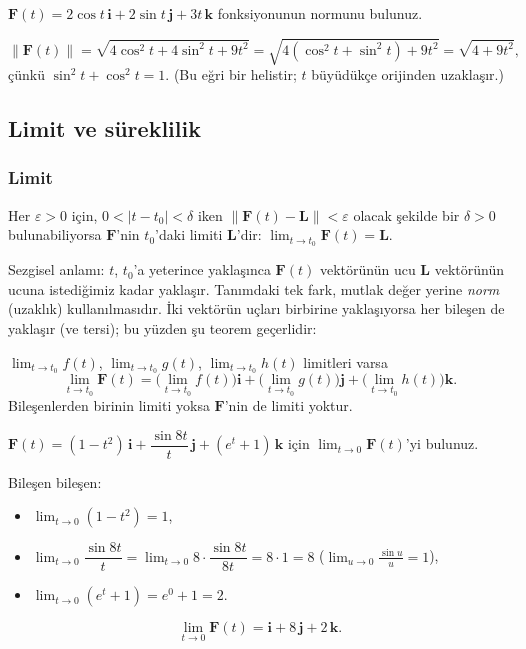 \begin{soru}
$\mathbf F(t)=2\cos t\,\mathbf i+2\sin t\,\mathbf j+3t\,\mathbf k$ fonksiyonunun normunu bulunuz.
\end{soru}
\begin{cevap}
\[ \|\mathbf F(t)\|=\sqrt{4\cos^2t+4\sin^2t+9t^2}=\sqrt{4(\cos^2t+\sin^2t)+9t^2}=\sqrt{4+9t^2}, \]
çünkü $\sin^2t+\cos^2t=1$. (Bu eğri bir helistir; $t$ büyüdükçe orijinden uzaklaşır.)
\end{cevap}

\subsection{Limit ve süreklilik}

\subsubsection{Limit}

\begin{tanim}[Limit]
Her $\varepsilon>0$ için, $0<|t-t_0|<\delta$ iken $\|\mathbf F(t)-\mathbf L\|<\varepsilon$ olacak şekilde bir $\delta>0$
bulunabiliyorsa $\mathbf F$'nin $t_0$'daki limiti $\mathbf L$'dir: $\displaystyle\lim_{t\to t_0}\mathbf F(t)=\mathbf L$.
\end{tanim}

Sezgisel anlamı: $t$, $t_0$'a yeterince yaklaşınca $\mathbf F(t)$ vektörünün ucu $\mathbf L$ vektörünün ucuna istediğimiz
kadar yaklaşır. Tanımdaki tek fark, mutlak değer yerine \emph{norm} (uzaklık) kullanılmasıdır. İki vektörün uçları
birbirine yaklaşıyorsa her bileşen de yaklaşır (ve tersi); bu yüzden şu teorem geçerlidir:

\begin{teorem}
$\lim_{t\to t_0}f(t)$, $\lim_{t\to t_0}g(t)$, $\lim_{t\to t_0}h(t)$ limitleri varsa
\[ \lim_{t\to t_0}\mathbf F(t)=\Big(\lim_{t\to t_0}f(t)\Big)\mathbf i+\Big(\lim_{t\to t_0}g(t)\Big)\mathbf j+\Big(\lim_{t\to t_0}h(t)\Big)\mathbf k . \]
Bileşenlerden birinin limiti yoksa $\mathbf F$'nin de limiti yoktur.
\end{teorem}

\begin{soru}
$\mathbf F(t)=(1-t^2)\,\mathbf i+\dfrac{\sin 8t}{t}\,\mathbf j+(e^t+1)\,\mathbf k$ için $\displaystyle\lim_{t\to0}\mathbf F(t)$'yi bulunuz.
\end{soru}
\begin{cevap}
Bileşen bileşen:
\begin{itemize}
\item $\lim_{t\to0}(1-t^2)=1$,
\item $\lim_{t\to0}\dfrac{\sin8t}{t}=\lim_{t\to0}8\cdot\dfrac{\sin8t}{8t}=8\cdot1=8$ \quad ($\lim_{u\to0}\frac{\sin u}{u}=1$),
\item $\lim_{t\to0}(e^t+1)=e^0+1=2$.
\end{itemize}
\[ \lim_{t\to0}\mathbf F(t)=\mathbf i+8\,\mathbf j+2\,\mathbf k . \]
\end{cevap}

